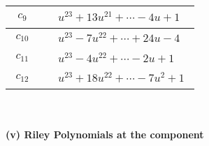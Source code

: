 \documentclass[1p]{elsarticle_modified}
\theoremstyle{definition}
\begin{document}
\begin{tabular}{m{50pt}|m{274pt}}
\hline $$\begin{aligned}c_{9}\end{aligned}$$&$\begin{aligned}
&u^{23}+13 u^{21}+\cdots-4 u+1
\end{aligned}$\\
\hline $$\begin{aligned}c_{10}\end{aligned}$$&$\begin{aligned}
&u^{23}-7 u^{22}+\cdots+24 u-4
\end{aligned}$\\
\hline $$\begin{aligned}c_{11}\end{aligned}$$&$\begin{aligned}
&u^{23}-4 u^{22}+\cdots-2 u+1
\end{aligned}$\\
\hline $$\begin{aligned}c_{12}\end{aligned}$$&$\begin{aligned}
&u^{23}+18 u^{22}+\cdots-7 u^2+1
\end{aligned}$\\
\hline
\end{tabular}\\~\\
\newpage\renewcommand{\arraystretch}{1}
\flushleft \textbf{(v) Riley Polynomials at the component}\newline \\
\end{document}
